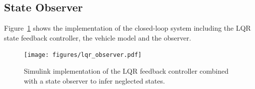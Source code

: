 \subsection{State Observer}
Figure~\ref{fig:lqr_and_observer} shows the implementation of the closed-loop system including the LQR state feedback controller, the vehicle model and the observer.

\begin{figure}[h]
	\centering
	\texttt{[image: figures/lqr\_observer.pdf]}
	\caption{Simulink implementation of the LQR feedback controller combined with a state observer to infer neglected states.}
	\label{fig:lqr_and_observer}
\end{figure}
